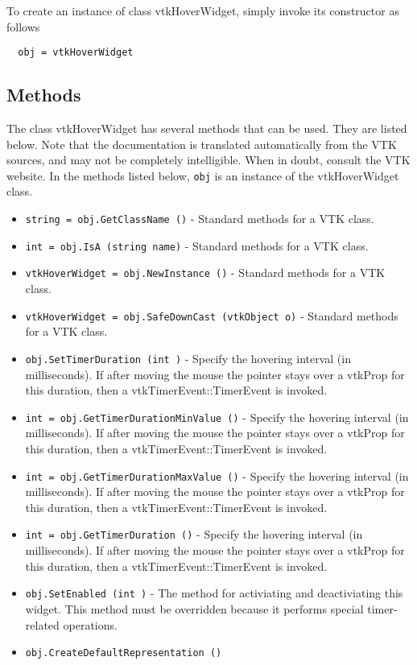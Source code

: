To create an instance of class vtkHoverWidget, simply
invoke its constructor as follows
\begin{verbatim}
  obj = vtkHoverWidget
\end{verbatim}
\subsection{Methods}

The class vtkHoverWidget has several methods that can be used.
  They are listed below.
Note that the documentation is translated automatically from the VTK sources,
and may not be completely intelligible.  When in doubt, consult the VTK website.
In the methods listed below, \verb|obj| is an instance of the vtkHoverWidget class.
\begin{itemize}
\item  \verb|string = obj.GetClassName ()| -  Standard methods for a VTK class.

\item  \verb|int = obj.IsA (string name)| -  Standard methods for a VTK class.

\item  \verb|vtkHoverWidget = obj.NewInstance ()| -  Standard methods for a VTK class.

\item  \verb|vtkHoverWidget = obj.SafeDownCast (vtkObject o)| -  Standard methods for a VTK class.

\item  \verb|obj.SetTimerDuration (int )| -  Specify the hovering interval (in milliseconds). If after moving the
 mouse the pointer stays over a vtkProp for this duration, then a
 vtkTimerEvent::TimerEvent is invoked.

\item  \verb|int = obj.GetTimerDurationMinValue ()| -  Specify the hovering interval (in milliseconds). If after moving the
 mouse the pointer stays over a vtkProp for this duration, then a
 vtkTimerEvent::TimerEvent is invoked.

\item  \verb|int = obj.GetTimerDurationMaxValue ()| -  Specify the hovering interval (in milliseconds). If after moving the
 mouse the pointer stays over a vtkProp for this duration, then a
 vtkTimerEvent::TimerEvent is invoked.

\item  \verb|int = obj.GetTimerDuration ()| -  Specify the hovering interval (in milliseconds). If after moving the
 mouse the pointer stays over a vtkProp for this duration, then a
 vtkTimerEvent::TimerEvent is invoked.

\item  \verb|obj.SetEnabled (int )| -  The method for activiating and deactiviating this widget. This method
 must be overridden because it performs special timer-related operations.

\item  \verb|obj.CreateDefaultRepresentation ()|

\end{itemize}
